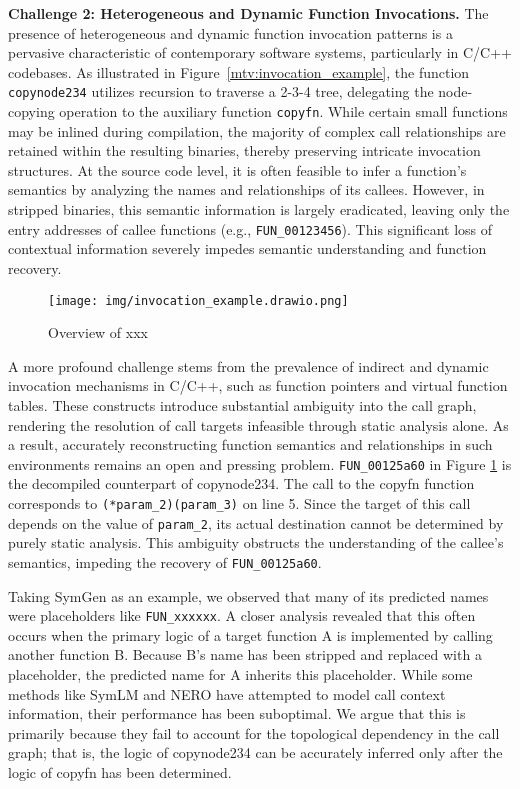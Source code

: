 \documentclass[acmsmall,screen,review,anonymous]{acmart} %
\begin{document}
\textbf{Challenge 2: Heterogeneous and Dynamic Function Invocations.}
The presence of heterogeneous and dynamic function invocation patterns is a pervasive characteristic of contemporary software systems, particularly in C/C++ codebases. As illustrated in Figure~\ref{mtv:invocation_example}, the function \lstinline{copynode234} utilizes recursion to traverse a 2-3-4 tree, delegating the node-copying operation to the auxiliary function \lstinline{copyfn}. While certain small functions may be inlined during compilation, the majority of complex call relationships are retained within the resulting binaries, thereby preserving intricate invocation structures. At the source code level, it is often feasible to infer a function’s semantics by analyzing the names and relationships of its callees. However, in stripped binaries, this semantic information is largely eradicated, leaving only the entry addresses of callee functions (e.g., \lstinline{FUN_00123456}). This significant loss of contextual information severely impedes semantic understanding and function recovery.


\begin{figure}[h] %
    \centering
    \texttt{[image: img/invocation\_example.drawio.png]} %
    \caption{Overview of xxx } %
    \label{fig:invocation_example} %
\end{figure}

A more profound challenge stems from the prevalence of indirect and dynamic invocation mechanisms in C/C++, such as function pointers and virtual function tables. These constructs introduce substantial ambiguity into the call graph, rendering the resolution of call targets infeasible through static analysis alone. As a result, accurately reconstructing function semantics and relationships in such environments remains an open and pressing problem. \lstinline{FUN_00125a60} in Figure \ref{fig:invocation_example} is the decompiled counterpart of copynode234. The call to the copyfn function corresponds to \lstinline{(*param_2)(param_3)} on line 5. Since the target of this call depends on the value of \lstinline{param_2}, its actual destination cannot be determined by purely static analysis. This ambiguity obstructs the understanding of the callee's semantics, impeding the recovery of \lstinline{FUN_00125a60}.

Taking SymGen\cite{SymGen} as an example, we observed that many of its predicted names were placeholders like \lstinline{FUN_xxxxxx}. A closer analysis revealed that this often occurs when the primary logic of a target function A is implemented by calling another function B. Because B's name has been stripped and replaced with a placeholder, the predicted name for A inherits this placeholder. While some methods like SymLM\cite{SymLM} and NERO\cite{NERO} have attempted to model call context information, their performance has been suboptimal. We argue that this is primarily because they fail to account for the topological dependency in the call graph; that is, the logic of copynode234 can be accurately inferred only after the logic of copyfn has been determined.
\end{document}
